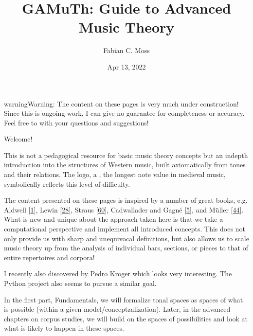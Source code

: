 \documentclass[letterpaper,10pt,english]{sphinxmanual}
\title{GAMuTh: Guide to Advanced Music Theory}
\date{Apr 13, 2022}
\author{Fabian C.\@{} Moss}
\begin{document}
\pagestyle{empty}
\sphinxmaketitle
\pagestyle{plain}
\sphinxtableofcontents
\pagestyle{normal}
\label{\detokenize{index::doc}}


\begin{sphinxadmonition}{warning}{Warning:}
\sphinxAtStartPar
The content on these pages is very much under construction!
Since this is ongoing work, I can give no guarantee for completeness or accuracy.
Feel free to  with your questions and suggestions!
\end{sphinxadmonition}

\sphinxAtStartPar
Welcome!

\sphinxAtStartPar
This is not a pedagogical resource for basic music theory concepts
but an in\sphinxhyphen{}depth introduction into the structures of Western music,
built axiomatically from tones and their relations.
The logo, a , the longest note value in medieval music,
symbolically reflects this level of difficulty.

\sphinxAtStartPar
The content presented on these pages is inspired by a number
of great books, e.g.
Aldwell  {[}\hyperlink{cite.8_bibliography:id12}{1}{]}, Lewin {[}\hyperlink{cite.8_bibliography:id2}{28}{]}, Straus {[}\hyperlink{cite.8_bibliography:id3}{60}{]},
Cadwallader and Gagné {[}\hyperlink{cite.8_bibliography:id18}{5}{]}, and Müller {[}\hyperlink{cite.8_bibliography:id24}{44}{]}.
What is new and unique about the approach taken here is that we take
a computational perspective and implement all introduced concepts.
This does not only provide us with sharp and unequivocal definitions,
but also allows us to scale music theory up from the analysis of individual
bars, sections, or pieces to that of entire repertoires and corpora!

\sphinxAtStartPar
I recently also discovered  by Pedro Kroger
which looks very interesting.
The Python project  also seems to pursue a similar goal.

\sphinxAtStartPar
In the first part, Fundamentals, we will formalize
tonal spaces as spaces of what is possible
(within a given model/conceptzalization).
Later, in the advanced chapters on corpus studies,
we will build on the spaces of possibilities
and look at what is likely to happen in these spaces.
\end{document}
